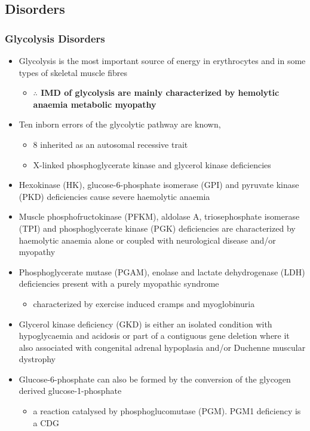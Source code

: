 \documentclass{scrartcl}
\begin{document}
\subsection{Disorders}
\label{sec:orgf8580f4}
\subsubsection{Glycolysis Disorders}
\label{sec:org1d03141}
\begin{itemize}
\item Glycolysis is the most important source of energy in erythrocytes
and in some types of skeletal muscle fibres

\begin{itemize}
\item \textbf{\(\therefore\) IMD of glycolysis are mainly characterized by hemolytic}
\textbf{anaemia \textpm{} metabolic myopathy}
\end{itemize}

\item Ten inborn errors of the glycolytic pathway are known,
\begin{itemize}
\item 8 inherited as an autosomal recessive trait
\item X-linked phosphoglycerate kinase and glycerol kinase deficiencies
\end{itemize}

\item Hexokinase (HK), glucose-6-phosphate isomerase (GPI) and pyruvate
kinase (PKD) deficiencies cause severe haemolytic anaemia

\item Muscle phosphofructokinase (PFKM), aldolase A, triosephosphate
isomerase (TPI) and phosphoglycerate kinase (PGK) deficiencies are
characterized by haemolytic anaemia alone or coupled with
neurological disease and/or myopathy

\item Phosphoglycerate mutase (PGAM), enolase and lactate dehydrogenase
(LDH) deficiencies present with a purely myopathic syndrome
\begin{itemize}
\item characterized by exercise induced cramps and myoglobinuria
\end{itemize}

\item Glycerol kinase deficiency (GKD) is either an isolated condition
with hypoglycaemia and acidosis or part of a contiguous
gene deletion where it also associated with congenital adrenal
hypoplasia and/or Duchenne muscular dystrophy

\item Glucose-6-phosphate can also be formed by the conversion of the
glycogen derived glucose-1-phosphate

\begin{itemize}
\item a reaction catalysed by
phosphoglucomutase (PGM). PGM1 deficiency is a CDG
\end{itemize}
\end{itemize}
\end{document}
